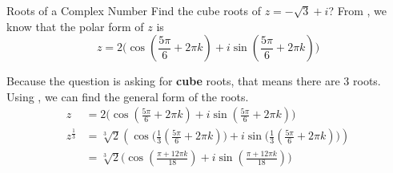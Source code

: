 \begin{example}{Roots of a Complex Number}
  Find the cube roots of $z = -\sqrt{3} + i$?
  \tcblower{}
  From , we know that the polar form of $z$ is
  \begin{equation*}
    z = 2 \biggl( \cos \left( \frac{5 \pi}{6} + 2 \pi k \right) + i \sin \left( \frac{5 \pi}{6} + 2 \pi k \right) \biggr)
  \end{equation*}

  Because the question is asking for \textbf{cube} roots, that means there are 3 roots.
  Using , we can find the general form of the roots.
  \begin{align*}
    z &= 2 \biggl( \cos \left( \frac{5 \pi}{6} + 2 \pi k \right) + i \sin \left( \frac{5 \pi}{6} + 2 \pi k \right) \biggr) \\
    z^{\frac{1}{3}} &= \sqrt[3]{2} \left( \cos \Biggl( \frac{1}{3} \left( \frac{5 \pi}{6} + 2 \pi k \right) \Biggr) + i \sin \Biggl( \frac{1}{3} \left( \frac{5 \pi}{6} + 2 \pi k \right)  \Biggr) \right) \\
    &= \sqrt[3]{2} \biggl( \cos \left( \frac{\pi + 12 \pi k}{18} \right) + i \sin \left( \frac{\pi + 12 \pi k}{18} \right) \biggr)
  \end{align*}


\end{example}
